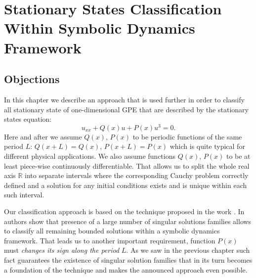 \chapter{Stationary States Classification Within Symbolic Dynamics Framework}

\section{Objections}

In this chapter we describe an approach that is used further in order to classify all stationary state of one-dimensional GPE that are described by the stationary states equation:
\begin{equation}
	u_{xx} + Q(x) u + P(x) u^3 = 0.
	\label{eq:stationary}
\end{equation}
Here and after we assume $Q(x)$, $P(x)$ to be periodic functions of the same period $L$: $Q(x + L) = Q(x)$, $P(x + L) = P(x)$ which is quite typical for different physical applications.
We also assume functions $Q(x)$, $P(x)$ to be at least piece-wise continuously differentiable.
That allows us to split the whole real axis $\mathbb{R}$ into separate intervals where the corresponding Cauchy problem correctly defined and a solution for any initial conditions exists and is unique within each such interval.

Our classification approach is based on the technique proposed in the work \cite{AlfimovAvramenko}.
In \cite{AlfimovAvramenko} authors show that presence of a large number of singular solutions families allows to classify all remaining bounded solutions within a symbolic dynamics framework.
That leads us to another important requirement, function $P(x)$ must {\it changes its sign along the period} $L$.
As we saw in the previous chapter such fact guarantees the existence of singular solution families that in its turn becomes a foundation of the technique and makes the announced approach even possible.

